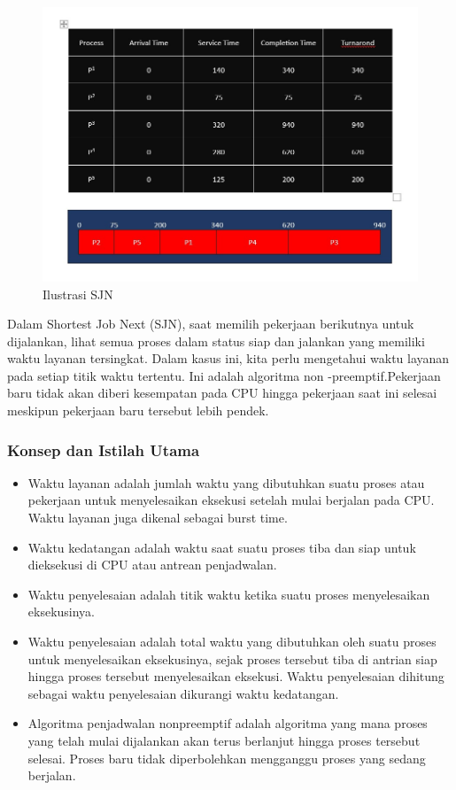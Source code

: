 \documentclass[12pt]{article}
\begin{document}
\begin{figure}[h]
    \centering
    \includegraphics[width=1\textwidth]{asset/sjn-illustration.jpg}
    \caption{Ilustrasi SJN}
    \label{fig:ilustrasi sjn}
\end{figure}

 Dalam Shortest Job Next (SJN), saat memilih pekerjaan berikutnya untuk dijalankan, lihat semua proses dalam status siap dan jalankan yang memiliki waktu layanan tersingkat. Dalam kasus ini, kita perlu mengetahui waktu layanan pada setiap titik waktu tertentu. Ini adalah algoritma non -preemptif.Pekerjaan baru tidak akan diberi kesempatan pada CPU hingga pekerjaan saat ini selesai meskipun pekerjaan baru tersebut lebih pendek.
 \subsubsection{Konsep dan Istilah Utama}
\begin{itemize}
    \item Waktu layanan adalah jumlah waktu yang dibutuhkan suatu proses atau pekerjaan untuk menyelesaikan eksekusi setelah mulai berjalan pada CPU. Waktu layanan juga dikenal sebagai burst time.
    \item Waktu kedatangan adalah waktu saat suatu proses tiba dan siap untuk dieksekusi di CPU atau antrean penjadwalan.
    \item Waktu penyelesaian adalah titik waktu ketika suatu proses menyelesaikan eksekusinya.
    \item Waktu penyelesaian adalah total waktu yang dibutuhkan oleh suatu proses untuk menyelesaikan eksekusinya, sejak proses tersebut tiba di antrian siap hingga proses tersebut menyelesaikan eksekusi. Waktu penyelesaian dihitung sebagai waktu penyelesaian dikurangi waktu kedatangan.
    \item Algoritma penjadwalan nonpreemptif adalah algoritma yang mana proses yang telah mulai dijalankan akan terus berlanjut hingga proses tersebut selesai. Proses baru tidak diperbolehkan mengganggu proses yang sedang berjalan.
\end{itemize}
\end{document}
